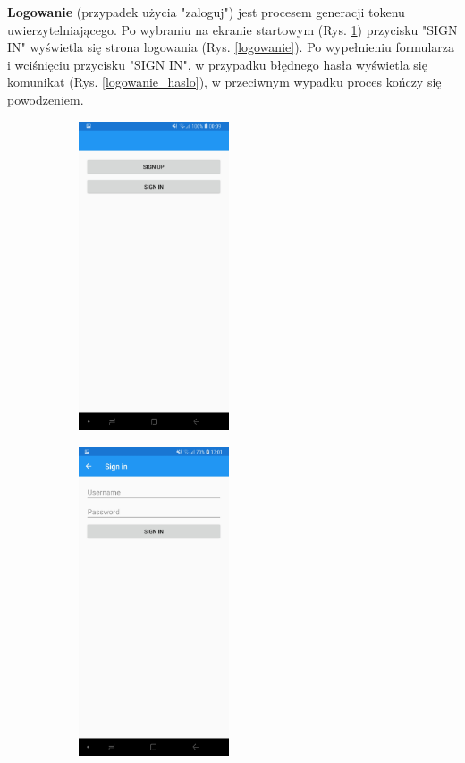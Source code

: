 \textbf{Logowanie} (przypadek użycia "zaloguj") jest procesem generacji tokenu uwierzytelniającego. Po wybraniu na ekranie startowym (Rys. \ref{ekran_startowy_logowanie}) przycisku "SIGN IN" wyświetla się strona logowania (Rys. \ref{logowanie}). Po wypełnieniu formularza i wciśnięciu przycisku "SIGN IN", w przypadku błędnego hasła wyświetla się komunikat (Rys. \ref{logowanie_haslo}), w przeciwnym wypadku proces kończy się powodzeniem.
\begin{figure}[!ht]
	\begin{center}
		\begin{subfigure}[b]{0.3\textwidth}
			\includegraphics[width=1.75in]{img/mobile/ekran_startowy.jpg}
			\label{ekran_startowy_logowanie}
		\end{subfigure}
		\begin{subfigure}[b]{0.3\textwidth}
			\includegraphics[width=1.75in]{img/mobile/login.jpg}

\end{subfigure}
\end{center}
\end{figure}
